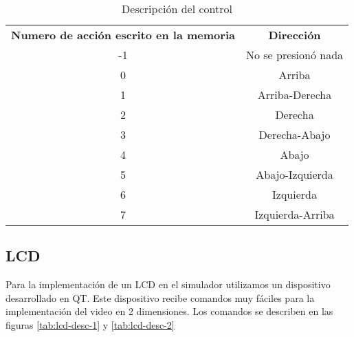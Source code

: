 \begin{table}
\begin{tabular}{|c|c|}
\textbf{Numero de acción escrito en la memoria} & \textbf{Dirección} \\
-1 & No se presionó nada \\
0 & Arriba \\
1 & Arriba-Derecha \\
2 & Derecha \\
3 & Derecha-Abajo \\
4 & Abajo \\
5 & Abajo-Izquierda\\
6 & Izquierda\\
7 & Izquierda-Arriba\\
\end{tabular}
\caption{\label{tab:control-desc}Descripción del control}
\end{table}

\subsection{LCD}

Para la implementación de un LCD en el simulador utilizamos un dispositivo desarrollado en QT. Este dispositivo recibe comandos muy fáciles para la implementación del video en 2 dimensiones. Los comandos se describen en las figuras \ref{tab:lcd-desc-1} y \ref{tab:lcd-desc-2}

